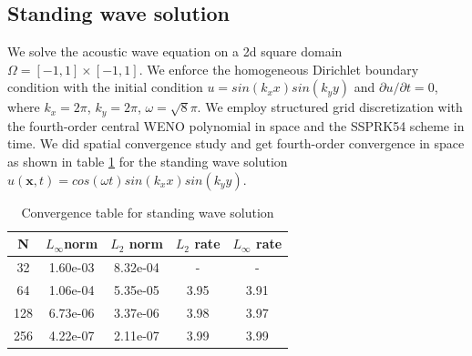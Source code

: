 \documentclass[12pt]{article}
\begin{document}
\subsection*{Standing wave solution}
We solve the acoustic wave equation on a 2d square domain $\Omega = [-1,1]\times[-1,1]$. We enforce the homogeneous Dirichlet boundary condition with the initial condition $u = sin(k_{x}x)sin(k_{y}y)$ and
${\partial u}/{\partial t} = 0$, where $k_{x} = {2\pi}$, $k_{y} = {2\pi}$, $\omega = \sqrt{8}\pi$. We employ structured grid discretization with the fourth-order central WENO polynomial in space and the SSPRK54 scheme in time. We did spatial convergence study and get fourth-order convergence in space as shown in table \ref{table:1} for the standing wave solution $u(\mathbf{x},t) = cos(\omega t)sin(k_{x}x)sin(k_{y}y)$.
\begin{table}[h]
	\centering
	\begin{tabular}{ |c|c|c|c|c| }
		\hline
		N   & $L_{\infty}$norm & $L_{2}$ norm & $L_{2}$ rate & $L_{\infty}$ rate \\ 
		\hline
		32  & 1.60e-03         & 8.32e-04     & -            & -                 \\
		64  & 1.06e-04         & 5.35e-05     & 3.95         & 3.91              \\
		128 & 6.73e-06         & 3.37e-06     & 3.98         & 3.97              \\
		256 & 4.22e-07         & 2.11e-07     & 3.99         & 3.99              \\
		\hline
	\end{tabular}
	\caption{Convergence table for standing wave solution}
	\label{table:1}
\end{table}
\end{document}
